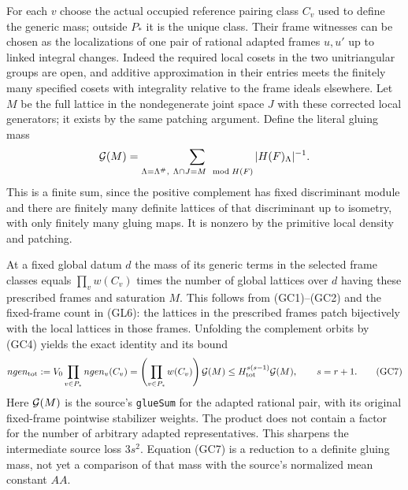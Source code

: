 For each \(v\) choose the actual occupied reference pairing
class \(C_v\) used to define the generic mass; outside
\(P_*\) it is the unique class. Their frame witnesses can
be chosen as the localizations of one pair of rational
adapted frames \(u,u'\) up to linked integral changes.
Indeed the required local cosets in the two unitriangular
groups are open, and additive approximation in their
entries meets the finitely many specified cosets with
integrality relative to the frame ideals elsewhere.
Let \(M\) be the full lattice in the nondegenerate joint
space \(J\) with these corrected local generators; it exists
by the same patching argument. Define the literal gluing mass
\[
 {\cal G}(M)=
 \sum_{\Lambda=\Lambda^\#,\ \Lambda\cap J=M\ \bmod H(F)}
                       |H(F)_\Lambda|^{-1}.
\]
This is a finite sum, since the positive complement has
fixed discriminant module and there are finitely many
definite lattices of that discriminant up to isometry, with
only finitely many gluing maps. It is nonzero by the primitive
local density and patching.

At a fixed global datum \(d\) the mass of its generic terms
in the selected frame classes equals
\(\prod_v w(C_v)\) times the number of global lattices over
\(d\) having these prescribed frames and saturation \(M\).
This follows from (GC1)--(GC2) and the fixed-frame count
in (GL6): the lattices in the prescribed frames patch
bijectively with the local lattices in those frames.
Unfolding the complement orbits by (GC4) yields the exact
identity and its bound
\[
 ngen_{\rm tot}:=V_0\prod_{v\in P_*}ngen_v(C_v)
       =\left(\prod_{v\in P_*}w(C_v)\right){\cal G}(M)
       \le H_{\rm tot}^{s(s-1)}{\cal G}(M),\qquad s=r+1.
 \tag{GC7}
\]
Here \({\cal G}(M)\) is the source's \texttt{glueSum} for
the adapted rational pair, with its original fixed-frame
pointwise stabilizer weights. The product does not contain
a factor for the number of arbitrary adapted representatives.
This sharpens the intermediate source loss \(3s^2\).
Equation (GC7) is a reduction to a definite gluing mass,
not yet a comparison of that mass with the source's
normalized mean constant \(AA\).

